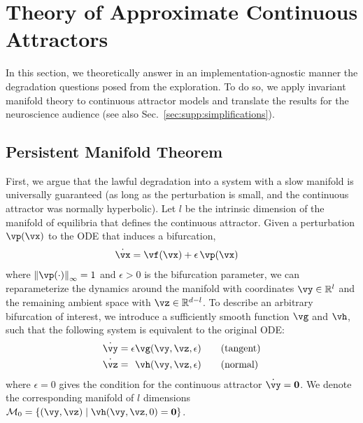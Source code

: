 \documentclass{article} %
\newcounter{ct}
\newcommand{\reals}{\mathbb{R}}
\newcommand{\manifold}{\mathcal{M}}
\newcommand{\uniformNorm}[1]{\left\|#1\right\|_\infty} %
\theoremstyle{definition}
\theoremstyle{remark}
\begin{document}
\section{Theory of Approximate Continuous Attractors}\label{sec:theory}
In this section, we theoretically answer in an implementation-agnostic manner the degradation questions posed from the exploration.
To do so, we apply invariant manifold theory to continuous attractor models and translate the results for the neuroscience audience (see also Sec.~\ref{sec:supp:simplifications}).
\subsection{Persistent Manifold Theorem}\label{sec:imt}
First, we argue that the lawful degradation into a system with a slow manifold is universally guaranteed (as long as the perturbation is small, and the continuous attractor was normally hyperbolic).
Let \(l\) be the intrinsic dimension of the manifold of equilibria that defines the continuous attractor.
Given a perturbation \(\vp(\vx)\) to the ODE that induces a bifurcation,
\begin{align}\label{eq:perturbation:nonparam}
	\dot{\vx} &= \vf(\vx) + \epsilon\,\vp(\vx)
\end{align}where \(\uniformNorm{\vp(\cdot)} = 1\) and \(\epsilon > 0\) is the bifurcation parameter,
we can reparameterize the dynamics around the manifold with coordinates \(\vy \in \reals^{l}\) and the remaining ambient space with \(\vz \in \reals^{d - l}\).
To describe an arbitrary bifurcation of interest, we introduce a sufficiently smooth function \(\vg\) and \(\vh\), such that the following system is equivalent to the original ODE:
\begin{align}
    \dot{\vy} &=           \epsilon  \vg(\vy, \vz, \epsilon) \qquad \text{(tangent)}\label{eq:fenichel:flowtangent}\\
    \dot{\vz} &= \hphantom{\epsilon} \vh(\vy, \vz, \epsilon) \qquad \text{(normal)}\label{eq:fenichel:flownormal}
\end{align}where \(\epsilon = 0\) gives the condition for the continuous attractor \(\dot{\vy} = \mathbf{0}\).
We denote the corresponding manifold of \(l\) dimensions \(\manifold_{0} = \{(\vy,\vz) \mid \vh(\vy,\vz, 0) = \mathbf{0} \}\).
\end{document}
